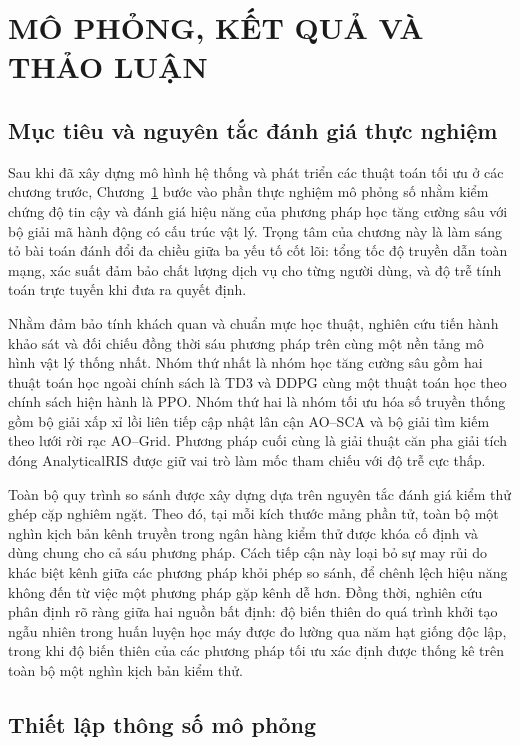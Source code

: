 \chapter{MÔ PHỎNG, KẾT QUẢ VÀ THẢO LUẬN}
\label{chap:ket-qua}

\section{Mục tiêu và nguyên tắc đánh giá thực nghiệm}
\label{sec:muc-tieu-danh-gia}

Sau khi đã xây dựng mô hình hệ thống và phát triển các thuật toán tối ưu ở các chương trước,
Chương~\ref{chap:ket-qua} bước vào phần thực nghiệm mô phỏng số nhằm kiểm chứng độ tin cậy và đánh giá hiệu
năng của phương pháp học tăng cường sâu với bộ giải mã hành động có cấu trúc vật lý. Trọng tâm của chương này là
làm sáng tỏ bài toán đánh đổi đa chiều giữa ba yếu tố cốt lõi: tổng tốc độ truyền dẫn toàn mạng, xác suất đảm bảo
chất lượng dịch vụ cho từng người dùng, và độ trễ tính toán trực tuyến khi đưa ra quyết định.

Nhằm đảm bảo tính khách quan và chuẩn mực học thuật, nghiên cứu tiến hành khảo sát và đối chiếu đồng thời sáu
phương pháp trên cùng một nền tảng mô hình vật lý thống nhất. Nhóm thứ nhất là nhóm học tăng cường sâu gồm hai
thuật toán học ngoài chính sách là TD3 và DDPG cùng một thuật toán học theo chính sách hiện hành là PPO. Nhóm thứ
hai là nhóm tối ưu hóa số truyền thống gồm bộ giải xấp xỉ lồi liên tiếp cập nhật lân cận AO--SCA và bộ giải tìm
kiếm theo lưới rời rạc AO--Grid. Phương pháp cuối cùng là giải thuật căn pha giải tích đóng AnalyticalRIS được giữ
vai trò làm mốc tham chiếu với độ trễ cực thấp.

Toàn bộ quy trình so sánh được xây dựng dựa trên nguyên tắc đánh giá kiểm thử ghép cặp nghiêm ngặt. Theo đó, tại
mỗi kích thước mảng phần tử, toàn bộ một nghìn kịch bản kênh truyền trong ngân hàng kiểm thử được khóa cố định và
dùng chung cho cả sáu phương pháp. Cách tiếp cận này loại bỏ sự may rủi do khác biệt kênh giữa các phương pháp
khỏi phép so sánh, để chênh lệch hiệu năng không đến từ việc một phương pháp gặp kênh dễ hơn. Đồng thời, nghiên cứu
phân định rõ ràng giữa hai nguồn bất định: độ biến thiên do quá trình khởi tạo ngẫu nhiên trong huấn luyện học máy
được đo lường qua năm hạt giống độc lập, trong khi độ biến thiên của các phương pháp tối ưu xác định được thống kê
trên toàn bộ một nghìn kịch bản kiểm thử.

\section{Thiết lập thông số mô phỏng}
\label{sec:thiet-lap}

